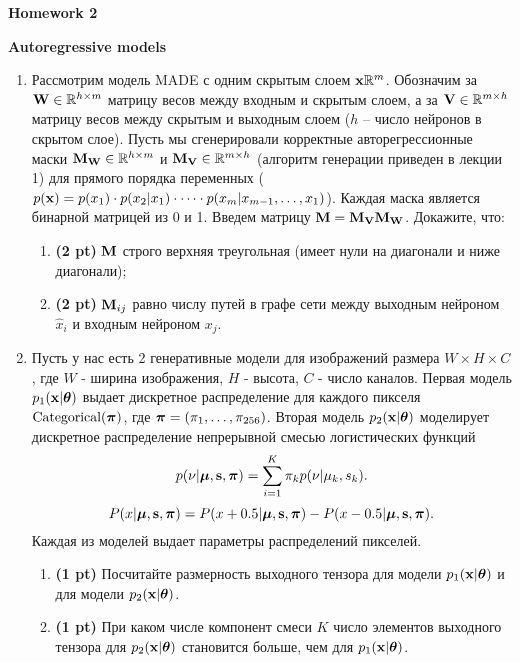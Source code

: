 \documentclass{article}
\begin{document}
\begin{center}
    {\Large \textbf{Homework 2}} \\
\end{center}

{\large \textbf{Autoregressive models}}
\begin{enumerate}
    \item Рассмотрим модель MADE с одним скрытым слоем $\mathbf{x} \mathbb{R}^m$. Обозначим за $\mathbf{W} \in \mathbb{R}^{h \times m}$ матрицу весов между входным и скрытым слоем, а за $\mathbf{V} \in \mathbb{R}^{m \times h}$ матрицу весов между скрытым и выходным слоем ($h$ -- число нейронов в скрытом слое). Пусть мы сгенерировали корректные авторегрессионные маски $\mathbf{M}_{\mathbf{W}} \in \mathbb{R}^{h \times m}$ и $\mathbf{M}_{\mathbf{V}} \in \mathbb{R}^{m \times h}$ (алгоритм генерации приведен в лекции 1) для прямого порядка переменных ($p(\mathbf{x}) = p(x_1) \cdot p(x_2 | x_1) \cdot \dots \cdot p(x_m | x_{m-1}, \dots, x_1)$). Каждая маска является бинарной матрицей из 0 и 1. Введем матрицу $\mathbf{M} = \mathbf{M}_{\mathbf{V}} \mathbf{M}_{\mathbf{W}}$. Докажите, что:
    \begin{enumerate}
    	\item  \textbf{(2 pt)} $\mathbf{M}$ строго верхняя треугольная (имеет нули на диагонали и ниже диагонали);
    	\item  \textbf{(2 pt)} $\mathbf{M}_{ij}$ равно числу путей в графе сети между выходным нейроном $\hat{x}_i$ и входным нейроном $x_j$.
    \end{enumerate}
    \item Пусть у нас есть 2 генеративные модели для изображений размера $W \times H \times C$, где $W$ - ширина изображения, $H$ - высота, $C$ - число каналов. Первая модель $p_1(\mathbf{x} | \boldsymbol{\theta})$ выдает дискретное распределение для каждого пикселя $\text{Categorical}(\boldsymbol{\pi})$, где $\boldsymbol{\pi} = (\pi_1, \dots,  \pi_{256})$. Вторая модель $p_2(\mathbf{x} | \boldsymbol{\theta})$ моделирует дискретное распределение непрерывной смесью логистических функций
   		\[
  				p(\nu | \boldsymbol{\mu}, \mathbf{s}, \boldsymbol{\pi}) = \sum_{i=1}^K \pi_k p(\nu | \mu_k, s_k).
		\]
    	\[
    		P(x | \boldsymbol{\mu}, \mathbf{s}, \boldsymbol{\pi}) = P(x + 0.5 | \boldsymbol{\mu}, \mathbf{s}, \boldsymbol{\pi}) - P(x - 0.5 | \boldsymbol{\mu}, \mathbf{s}, \boldsymbol{\pi}).
    	\]
    Каждая из моделей выдает параметры распределений пикселей.
    	\begin{enumerate}
    		\item \textbf{(1 pt)} Посчитайте размерность выходного тензора для модели $p_1(\mathbf{x} | \boldsymbol{\theta})$ и для модели $p_2(\mathbf{x} | \boldsymbol{\theta})$. 
    		\item \textbf{(1 pt)} При каком числе компонент смеси $K$ число элементов выходного тензора для $p_2(\mathbf{x} | \boldsymbol{\theta})$ становится больше, чем для $p_1(\mathbf{x} | \boldsymbol{\theta})$.
    	\end{enumerate}
\end{enumerate}
\end{document}
